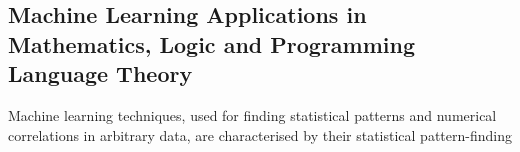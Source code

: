 \subsection{Machine Learning Applications in Mathematics, Logic and Programming
  Language Theory}

Machine learning techniques, used for finding statistical patterns and numerical
correlations in arbitrary data, are characterised by their statistical
pattern-finding



